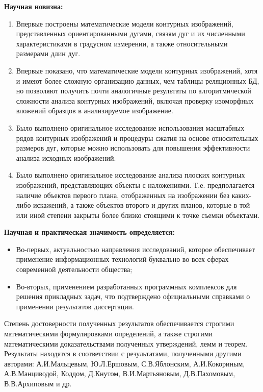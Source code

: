 \textbf{Научная новизна:}
\begin{enumerate}
\item Впервые построены математические модели контурных изображений, представленных ориентированными дугами, связям дуг и их численными характеристиками в градусном измерении,  а также  относительными размерами  длин дуг.  
\item Впервые  показано, что математические модели контурных изображений, хотя и имеют более сложную организацию данных, чем  таблицы реляционных БД, но позволяют получить почти аналогичные результаты по алгоритмической сложности  анализа контурных изображений, включая проверку изоморфных вложений образцов в анализируемое изображение.
\item Было выполнено оригинальное исследование использования масштабных рядов контурных изображений и процедуры сжатия на  основе относительных размеров дуг, которые можно использовать для повышения эффективности анализа исходных изображений.
\item Было выполнено оригинальное исследование анализа плоских контурных изображений, представляющих объекты с наложениями. Т.е. предполагается наличие объектов первого плана, отображенных на изображении без каких-либо искажений,  а также объектов второго и других планов, которые в той или иной степени закрыты более близко стоящими к точке съемки объектами.
\end{enumerate}

\noindent
\textbf{Научная и практическая значимость определяется:}
\begin{itemize}
\item Во-первых, актуальностью направления исследований, которое обеспечивает применение информационных технологий буквально во всех сферах современной деятельности общества;
\item Во-вторых, применением разработанных программных комплексов для решения прикладных задач, что подтверждено официальными справками о применении результатов диссертации.
\end{itemize}

Степень достоверности полученных результатов обеспечивается строгими математическими формулировками определений, а также строгими математическими доказательствами полученных утверждений, лемм и теорем.
Результаты находятся в соответствии с результатами, полученными другими авторами:  А.И.Мальцевым\cite{D12}, Ю.Л.Ершовым\cite{D12}, С.В.Яблонским\cite{D21}, А.И.Кокориным\cite{D10}, А.В.Манциводой\cite{D13},  Коддом\cite{D24,D25}, Д.Кнутом\cite{D9}, В.И.Мартьяновым\cite{D14}, Д.В.Пахомовым\cite{D16}, В.В.Архиповым\cite{D15} и др\cite{D1,D2,D3,D11}.


